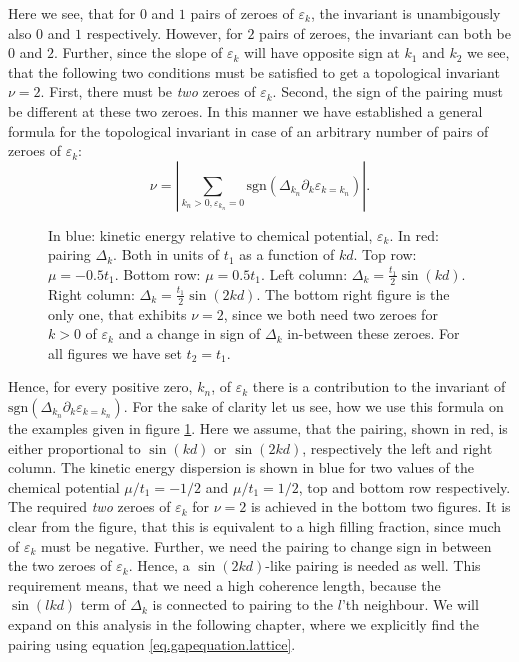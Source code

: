Here we see, that for $0$ and $1$ pairs of zeroes of $\varepsilon_k$, the invariant is unambigously also $0$ and $1$ respectively. However, for $2$ pairs of zeroes, the invariant can both be $0$ and $2$. Further, since the slope of $\varepsilon_k$ will have opposite sign at $k_1$ and $k_2$ we see, that the following two conditions must be satisfied to get a topological invariant $\nu = 2$. First, there must be \textit{two} zeroes of $\varepsilon_k$. Second, the sign of the pairing must be different at these two zeroes. In this manner we have established a general formula for the topological invariant in case of an arbitrary number of pairs of zeroes of $\varepsilon_k$:
\begin{equation}
\nu = \left|\sum_{k_n > 0, \varepsilon_{k_n} = 0} \text{sgn}\left(\Delta_{k_n}\partial_k\varepsilon_{k = k_n}\right)\right|.
\label{eq.topologicalinvariant}
\end{equation} 

\begin{figure}
\begin{center}

\caption{In blue: kinetic energy relative to chemical potential, $\varepsilon_k$. In red: pairing $\Delta_k$. Both in units of $t_1$ as a function of $kd$. Top row: $\mu = -0.5 t_1$. Bottom row: $\mu = 0.5 t_1$. Left column: $\Delta_k = \frac{t_1}{2}\sin(kd)$. Right column: $\Delta_k = \frac{t_1}{2}\sin(2kd)$. The bottom right figure is the only one, that exhibits $\nu = 2$, since we both need two zeroes for $k >0$ of $\varepsilon_k$ and a change in sign of $\Delta_k$ in-between these zeroes. For all figures we have set $t_2 = t_1$. }
\label{fig.dispersions.lattice}
\end{center}
\end{figure}

Hence, for every positive zero, $k_n$, of $\varepsilon_k$ there is a contribution to the invariant of $\text{sgn}\left(\Delta_{k_n}\partial_k\varepsilon_{k = k_n}\right)$. For the sake of clarity let us see, how we use this formula on the examples given in figure \ref{fig.dispersions.lattice}. Here we assume, that the pairing, shown in red, is either proportional to $\sin(kd)$ or $\sin(2kd)$, respectively the left and right column. The kinetic energy dispersion is shown in blue for two values of the chemical potential $\mu / t_1 = -1/2$ and $\mu / t_1 = 1/2$, top and bottom row respectively. The required \textit{two} zeroes of $\varepsilon_k$ for $\nu = 2$ is achieved in the bottom two figures. It is clear from the figure, that this is equivalent to a high filling fraction, since much of $\varepsilon_k$ must be negative. Further, we need the pairing to change sign in between the two zeroes of $\varepsilon_k$. Hence, a $\sin(2kd)$-like pairing is needed as well. This requirement means, that we need a high coherence length, because the $\sin(lkd)$ term of $\Delta_k$ is connected to pairing to the $l$'th neighbour. We will expand on this analysis in the following chapter, where we explicitly find the pairing using equation \eqref{eq.gapequation.lattice}.


